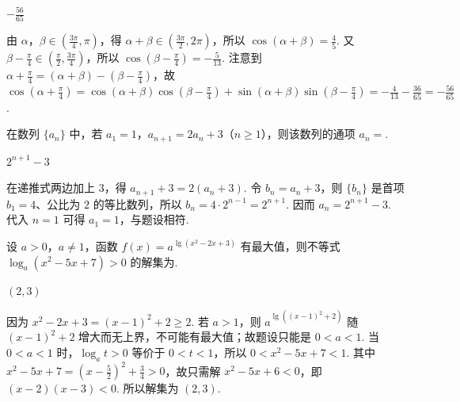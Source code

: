 \begin{answer}
\(-\frac{56}{65}\)
\end{answer}

\begin{solution}
由 \(\alpha\)，\(\beta\in\left(\frac{3\pi}{4},\pi\right)\)，得 \(\alpha+\beta\in\left(\frac{3\pi}{2},2\pi\right)\)，所以 \(\cos(\alpha+\beta)=\frac45\). 又 \(\beta-\frac\pi4\in\left(\frac\pi2,\frac{3\pi}{4}\right)\)，所以 \(\cos\left(\beta-\frac\pi4\right)=-\frac5{13}\). 注意到 \(\alpha+\frac\pi4=(\alpha+\beta)-\left(\beta-\frac\pi4\right)\)，故 \(\cos\left(\alpha+\frac\pi4\right)=\cos(\alpha+\beta)\cos\left(\beta-\frac\pi4\right)+\sin(\alpha+\beta)\sin\left(\beta-\frac\pi4\right)=-\frac4{13}-\frac{36}{65}=-\frac{56}{65}\).
\end{solution}

\begin{problem}
在数列 \(\{a_{n}\}\) 中，若 \(a_{1} = 1\)，\(a_{n+1} = 2a_{n} + 3\)（\(n \geqslant 1\)），则该数列的通项 \(a_{n} =\)\fillinblank{}.
\end{problem}

\begin{answer}
\(2^{n+1} - 3\)
\end{answer}

\begin{solution}
在递推式两边加上 \(3\)，得 \(a_{n+1}+3=2(a_n+3)\). 令 \(b_n=a_n+3\)，则 \(\{b_n\}\) 是首项 \(b_1=4\)、公比为 \(2\) 的等比数列，所以 \(b_n=4\cdot2^{n-1}=2^{n+1}\). 因而 \(a_n=2^{n+1}-3\). 代入 \(n=1\) 可得 \(a_1=1\)，与题设相符.
\end{solution}

\begin{problem}
设 \(a > 0\)，\(a \neq 1\)，函数 \(f(x) = a^{\lg(x^{2} - 2x + 3)}\) 有最大值，则不等式 \(\log_a(x^{2} - 5x + 7) > 0\) 的解集为\fillinblank{}.
\end{problem}

\begin{answer}
\((2,3)\)
\end{answer}

\begin{solution}
因为 \(x^{2}-2x+3=(x-1)^{2}+2\geqslant2\). 若 \(a>1\)，则 \(a^{\lg((x-1)^{2}+2)}\) 随 \((x-1)^{2}+2\) 增大而无上界，不可能有最大值；故题设只能是 \(0<a<1\). 当 \(0<a<1\) 时，\(\log_a t>0\) 等价于 \(0<t<1\)，所以 \(0<x^{2}-5x+7<1\). 其中 \(x^{2}-5x+7=(x-\frac52)^{2}+\frac34>0\)，故只需解 \(x^{2}-5x+6<0\)，即 \((x-2)(x-3)<0\). 所以解集为 \((2,3)\).
\end{solution}

